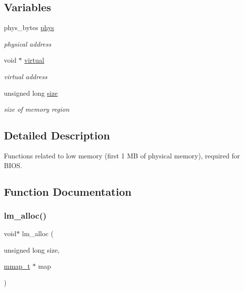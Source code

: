 \subsection*{Variables}
\begin{DoxyCompactItemize}
\item 
\hypertarget{group__lmlib_gab7a85fe0db943529016cf606e3a7167f}{}\label{group__lmlib_gab7a85fe0db943529016cf606e3a7167f} 
phys\+\_\+bytes \hyperlink{group__lmlib_gab7a85fe0db943529016cf606e3a7167f}{phys}
\begin{DoxyCompactList}\small\item\em physical address \end{DoxyCompactList}\item 
\hypertarget{group__lmlib_ga6a0ea2231d30f2b025e0c4b9f12dd6db}{}\label{group__lmlib_ga6a0ea2231d30f2b025e0c4b9f12dd6db} 
void $\ast$ \hyperlink{group__lmlib_ga6a0ea2231d30f2b025e0c4b9f12dd6db}{virtual}
\begin{DoxyCompactList}\small\item\em virtual address \end{DoxyCompactList}\item 
\hypertarget{group__lmlib_ga1e1268d164c38e4f8a4f4eb9058b0601}{}\label{group__lmlib_ga1e1268d164c38e4f8a4f4eb9058b0601} 
unsigned long \hyperlink{group__lmlib_ga1e1268d164c38e4f8a4f4eb9058b0601}{size}
\begin{DoxyCompactList}\small\item\em size of memory region \end{DoxyCompactList}\end{DoxyCompactItemize}


\subsection{Detailed Description}
Functions related to low memory (first 1 MB of physical memory), required for B\+I\+OS. 



\subsection{Function Documentation}
\hypertarget{group__lmlib_gae45d971ce2ffcf4dc2677eba033a92cd}{}\label{group__lmlib_gae45d971ce2ffcf4dc2677eba033a92cd} 
\subsubsection{\texorpdfstring{lm\+\_\+alloc()}{lm\_alloc()}}
{\footnotesize\ttfamily void$\ast$ lm\+\_\+alloc (\begin{DoxyParamCaption}\item[{unsigned long}]{size,  }\item[{\hyperlink{structmmap__t}{mmap\+\_\+t} $\ast$}]{map }\end{DoxyParamCaption})}



